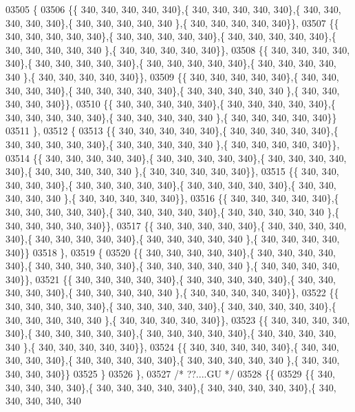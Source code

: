 \begin{DoxyCode}
03505 \{
03506 \{\{ 340, 340, 340, 340, 340\},\{ 340, 340, 340, 340, 340\},\{ 340, 340, 340, 340, 340\},\{ 340, 340, 340, 340, 340
      \},\{ 340, 340, 340, 340, 340\}\},
03507 \{\{ 340, 340, 340, 340, 340\},\{ 340, 340, 340, 340, 340\},\{ 340, 340, 340, 340, 340\},\{ 340, 340, 340, 340, 340
      \},\{ 340, 340, 340, 340, 340\}\},
03508 \{\{ 340, 340, 340, 340, 340\},\{ 340, 340, 340, 340, 340\},\{ 340, 340, 340, 340, 340\},\{ 340, 340, 340, 340, 340
      \},\{ 340, 340, 340, 340, 340\}\},
03509 \{\{ 340, 340, 340, 340, 340\},\{ 340, 340, 340, 340, 340\},\{ 340, 340, 340, 340, 340\},\{ 340, 340, 340, 340, 340
      \},\{ 340, 340, 340, 340, 340\}\},
03510 \{\{ 340, 340, 340, 340, 340\},\{ 340, 340, 340, 340, 340\},\{ 340, 340, 340, 340, 340\},\{ 340, 340, 340, 340, 340
      \},\{ 340, 340, 340, 340, 340\}\}
03511 \},
03512 \{
03513 \{\{ 340, 340, 340, 340, 340\},\{ 340, 340, 340, 340, 340\},\{ 340, 340, 340, 340, 340\},\{ 340, 340, 340, 340, 340
      \},\{ 340, 340, 340, 340, 340\}\},
03514 \{\{ 340, 340, 340, 340, 340\},\{ 340, 340, 340, 340, 340\},\{ 340, 340, 340, 340, 340\},\{ 340, 340, 340, 340, 340
      \},\{ 340, 340, 340, 340, 340\}\},
03515 \{\{ 340, 340, 340, 340, 340\},\{ 340, 340, 340, 340, 340\},\{ 340, 340, 340, 340, 340\},\{ 340, 340, 340, 340, 340
      \},\{ 340, 340, 340, 340, 340\}\},
03516 \{\{ 340, 340, 340, 340, 340\},\{ 340, 340, 340, 340, 340\},\{ 340, 340, 340, 340, 340\},\{ 340, 340, 340, 340, 340
      \},\{ 340, 340, 340, 340, 340\}\},
03517 \{\{ 340, 340, 340, 340, 340\},\{ 340, 340, 340, 340, 340\},\{ 340, 340, 340, 340, 340\},\{ 340, 340, 340, 340, 340
      \},\{ 340, 340, 340, 340, 340\}\}
03518 \},
03519 \{
03520 \{\{ 340, 340, 340, 340, 340\},\{ 340, 340, 340, 340, 340\},\{ 340, 340, 340, 340, 340\},\{ 340, 340, 340, 340, 340
      \},\{ 340, 340, 340, 340, 340\}\},
03521 \{\{ 340, 340, 340, 340, 340\},\{ 340, 340, 340, 340, 340\},\{ 340, 340, 340, 340, 340\},\{ 340, 340, 340, 340, 340
      \},\{ 340, 340, 340, 340, 340\}\},
03522 \{\{ 340, 340, 340, 340, 340\},\{ 340, 340, 340, 340, 340\},\{ 340, 340, 340, 340, 340\},\{ 340, 340, 340, 340, 340
      \},\{ 340, 340, 340, 340, 340\}\},
03523 \{\{ 340, 340, 340, 340, 340\},\{ 340, 340, 340, 340, 340\},\{ 340, 340, 340, 340, 340\},\{ 340, 340, 340, 340, 340
      \},\{ 340, 340, 340, 340, 340\}\},
03524 \{\{ 340, 340, 340, 340, 340\},\{ 340, 340, 340, 340, 340\},\{ 340, 340, 340, 340, 340\},\{ 340, 340, 340, 340, 340
      \},\{ 340, 340, 340, 340, 340\}\}
03525 \}
03526 \},
03527 \textcolor{comment}{/* ??....GU */}
03528 \{\{
03529 \{\{ 340, 340, 340, 340, 340\},\{ 340, 340, 340, 340, 340\},\{ 340, 340, 340, 340, 340\},\{ 340, 340, 340, 340, 340

\end{DoxyCode}
